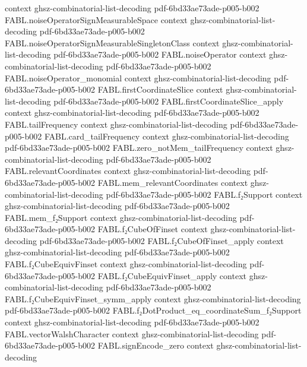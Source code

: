 \begin{theorem}
  {context}
  {ghsz-combinatorial-list-decoding}
  {pdf-6bd33ae73ade-p005-b002}
\proofstep
  {FABL.noiseOperatorSignMeasurableSpace}
  {context}
  {ghsz-combinatorial-list-decoding}
  {pdf-6bd33ae73ade-p005-b002}
\proofstep
  {FABL.noiseOperatorSignMeasurableSingletonClass}
  {context}
  {ghsz-combinatorial-list-decoding}
  {pdf-6bd33ae73ade-p005-b002}
\proofstep
  {FABL.noiseOperator}
  {context}
  {ghsz-combinatorial-list-decoding}
  {pdf-6bd33ae73ade-p005-b002}
\proofstep
  {FABL.noiseOperator_monomial}
  {context}
  {ghsz-combinatorial-list-decoding}
  {pdf-6bd33ae73ade-p005-b002}
\proofstep
  {FABL.firstCoordinateSlice}
  {context}
  {ghsz-combinatorial-list-decoding}
  {pdf-6bd33ae73ade-p005-b002}
\proofstep
  {FABL.firstCoordinateSlice_apply}
  {context}
  {ghsz-combinatorial-list-decoding}
  {pdf-6bd33ae73ade-p005-b002}
\proofstep
  {FABL.tailFrequency}
  {context}
  {ghsz-combinatorial-list-decoding}
  {pdf-6bd33ae73ade-p005-b002}
\proofstep
  {FABL.card_tailFrequency}
  {context}
  {ghsz-combinatorial-list-decoding}
  {pdf-6bd33ae73ade-p005-b002}
\proofstep
  {FABL.zero_notMem_tailFrequency}
  {context}
  {ghsz-combinatorial-list-decoding}
  {pdf-6bd33ae73ade-p005-b002}
\proofstep
  {FABL.relevantCoordinates}
  {context}
  {ghsz-combinatorial-list-decoding}
  {pdf-6bd33ae73ade-p005-b002}
\proofstep
  {FABL.mem_relevantCoordinates}
  {context}
  {ghsz-combinatorial-list-decoding}
  {pdf-6bd33ae73ade-p005-b002}
\proofstep
  {FABL.f₂Support}
  {context}
  {ghsz-combinatorial-list-decoding}
  {pdf-6bd33ae73ade-p005-b002}
\proofstep
  {FABL.mem_f₂Support}
  {context}
  {ghsz-combinatorial-list-decoding}
  {pdf-6bd33ae73ade-p005-b002}
\proofstep
  {FABL.f₂CubeOfFinset}
  {context}
  {ghsz-combinatorial-list-decoding}
  {pdf-6bd33ae73ade-p005-b002}
\proofstep
  {FABL.f₂CubeOfFinset_apply}
  {context}
  {ghsz-combinatorial-list-decoding}
  {pdf-6bd33ae73ade-p005-b002}
\proofstep
  {FABL.f₂CubeEquivFinset}
  {context}
  {ghsz-combinatorial-list-decoding}
  {pdf-6bd33ae73ade-p005-b002}
\proofstep
  {FABL.f₂CubeEquivFinset_apply}
  {context}
  {ghsz-combinatorial-list-decoding}
  {pdf-6bd33ae73ade-p005-b002}
\proofstep
  {FABL.f₂CubeEquivFinset_symm_apply}
  {context}
  {ghsz-combinatorial-list-decoding}
  {pdf-6bd33ae73ade-p005-b002}
\proofstep
  {FABL.f₂DotProduct_eq_coordinateSum_f₂Support}
  {context}
  {ghsz-combinatorial-list-decoding}
  {pdf-6bd33ae73ade-p005-b002}
\proofstep
  {FABL.vectorWalshCharacter}
  {context}
  {ghsz-combinatorial-list-decoding}
  {pdf-6bd33ae73ade-p005-b002}
\proofstep
  {FABL.signEncode_zero}
  {context}
  {ghsz-combinatorial-list-decoding}

\end{theorem}
